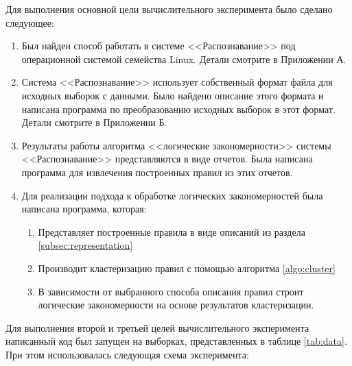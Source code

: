 \documentclass[12pt]{article}
\begin{document}
Для выполнения основной цели вычислительного эксперимента было сделано
следующее:
\begin{enumerate}
\item Был найден способ работать в системе <<Распознавание>> под
  операционной системой семейства Linux. Детали смотрите в Приложении
  А.
\item Система <<Распознавание>> использует собственный формат файла
  для исходных выборок с данными. Было найдено описание этого формата и
  написана программа по преобразованию исходных выборок в этот
  формат. Детали смотрите в Приложении Б.
\item Результаты работы алгоритма <<логические закономерности>>
  системы <<Распознавание>> представляются в виде отчетов. Была
  написана программа для извлечения построенных правил из этих
  отчетов.
\item Для реализации подхода к обработке логических закономерностей
  была написана программа, которая:
  \begin{enumerate}
  \item Представляет построенные правила в виде описаний из раздела
    \ref{subsec:representation}
  \item Производит кластеризацию правил с помощью алгоритма
    \ref{algo:cluster}
  \item В зависимости от выбранного способа описания правил строит
    логические закономерности на основе результатов кластеризации.
  \end{enumerate}
\end{enumerate}

Для выполнения второй и третьей целей вычислительного эксперимента
написанный код был запущен на выборках, представленных в таблице
\ref{tab:data}. При этом использовалась следующая схема эксперимента:
\end{document}
